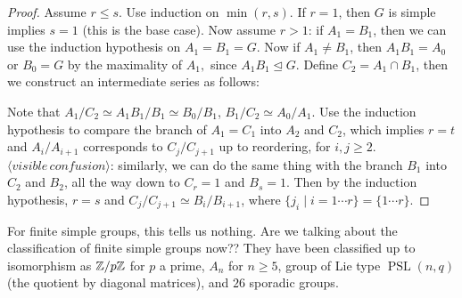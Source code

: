 \begin{proof}
Assume $r\leq s$. Use induction on $\operatorname{min}(r,s)$. If $r=1$, then $G$ is simple implies $s=1$ (this is the base case). Now assume $r>1$: if $A_1=B_1$, then we can use the induction hypothesis on $A_1=B_1=G$. Now if $A_1\neq B_1$, then $A_1B_1=A_0$ or $B_0=G$ by the maximality of $A_1,$ since $A_1B_1\trianglelefteq G$. Define $C_2=A_1\cap B_1$, then we construct an intermediate series as follows:
            \begin{figure}[H]
                \centering
            \end{figure}
Note that $A_1 /C_2 \simeq A_1B_1 /B_1 \simeq B_0 /B_1$, $B_1 /C_2 \simeq A_0 /A_1$. Use the induction hypothesis to compare the branch of $A_1=C_1$ into $A_2$ and $C_2$, which implies $r=t$ and $A_i /A_{i+1}$ corresponds to $C_j /C_{j+1}$ up to reordering, for $i,j\geq 2$. $\langle visible \, confusion \rangle $: similarly, we can do the same thing with the branch $B_1$ into $C_2$ and $B_2$, all the way down to $C_r=1$ and $B_s=1$. Then by the induction hypothesis, $r=s$ and $C_j / C_{j+1}\simeq B_i /B_{i+1}$, where $\{j_i  \mid i=1\cdots r\} =\{1\cdots r\} $.
\end{proof}

For finite simple groups, this tells us nothing. Are we talking about the classification of finite simple groups now?? They have been classified up to isomorphism as $\mathbb{Z} /p\mathbb{Z}$ for $p$ a prime, $A_n$ for $n\geq 5$, group of Lie type $\operatorname{PSL}(n,q)$ (the quotient by diagonal matrices), and $26$ sporadic groups.

